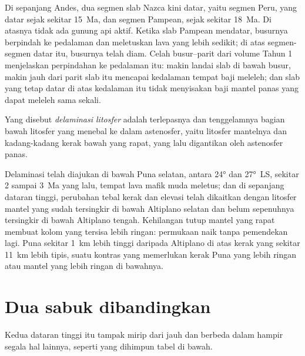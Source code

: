 Di sepanjang Andes, dua segmen slab Nazca kini datar, yaitu segmen Peru, yang datar
sejak sekitar \qty{15}{Ma}, dan segmen Pampean, sejak sekitar \qty{18}{Ma}. Di atasnya tidak ada
gunung api aktif. Ketika slab Pampean mendatar, busurnya berpindah ke pedalaman dan meletuskan
lava yang lebih sedikit; di atas segmen-segmen datar itu, busurnya telah diam. Celah busur--parit dari volume Tahun 1
menjelaskan perpindahan ke pedalaman itu: makin landai slab di bawah busur, makin jauh dari parit slab itu
mencapai kedalaman tempat baji meleleh; dan slab yang tetap datar di atas kedalaman itu tidak menyisakan
baji mantel panas yang dapat meleleh sama sekali.

\begin{definition}\label{def:b2:himalaya-andes:delamination}
Yang disebut \emph{delaminasi litosfer} adalah terlepasnya dan
tenggelamnya bagian bawah litosfer yang menebal ke dalam astenosfer, yaitu litosfer mantelnya
dan kadang-kadang kerak bawah yang rapat, yang lalu digantikan oleh astenosfer panas.
\end{definition}

Delaminasi telah diajukan di bawah Puna selatan, antara \ang{24} dan \ang{27}~LS,
sekitar 2 sampai \qty{3}{Ma} yang lalu, tempat lava mafik muda meletus; dan di sepanjang dataran tinggi, perubahan
tebal kerak dan elevasi telah dikaitkan dengan litosfer mantel yang sudah tersingkir
di bawah Altiplano selatan dan belum sepenuhnya tersingkir di bawah Altiplano tengah. Kehilangan
tutup mantel yang rapat membuat kolom yang tersisa lebih ringan: permukaan naik tanpa pemendekan
lagi. Puna sekitar \qty{1}{km} lebih tinggi daripada Altiplano di atas kerak yang sekitar
\qty{11}{km} lebih tipis, suatu kontras yang memerlukan kerak Puna yang lebih ringan atau mantel yang lebih ringan
di bawahnya.

\section{Dua sabuk dibandingkan}\label{sec:b2:himalaya-andes:compared}

Kedua dataran tinggi itu tampak mirip dari jauh dan berbeda dalam hampir segala hal lainnya, seperti yang dihimpun
tabel di bawah.

